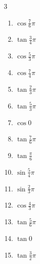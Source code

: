 \begin{multicols}{3}
\begin{enumerate}
  \item $\displaystyle \cos{\frac{7}{6}\pi}$

  \item $\displaystyle \tan{\frac{3}{4}\pi}$
        \phantom{$\displaystyle =-1$}

  \item $\displaystyle \cos{\frac{5}{3}\pi}$

  \item $\displaystyle \cos{\frac{7}{4}\pi}$

  \item $\displaystyle \tan{\frac{2}{3}\pi}$

  \item $\displaystyle \tan{\frac{5}{3}\pi}$

  \item $\displaystyle \cos{0}$
        \phantom{$\displaystyle =1$}

\columnbreak %

\resetques

  \item $\displaystyle \tan{\frac{7}{6}\pi}$

  \item $\displaystyle \tan{\frac{\pi}{6}}$

  \item $\displaystyle \sin{\frac{5}{4}\pi}$

  \item $\displaystyle \sin{\frac{2}{3}\pi}$

  \item $\displaystyle \cos{\frac{4}{3}\pi}$

  \item $\displaystyle \tan{\frac{5}{6}\pi}$

  \item $\displaystyle \tan{0}$
        \phantom{$\displaystyle =0$}

  \item $\displaystyle \tan{\frac{3}{2}\pi}$
        \phantom{$\displaystyle \quad なし$}


\end{enumerate}
\end{multicols}
